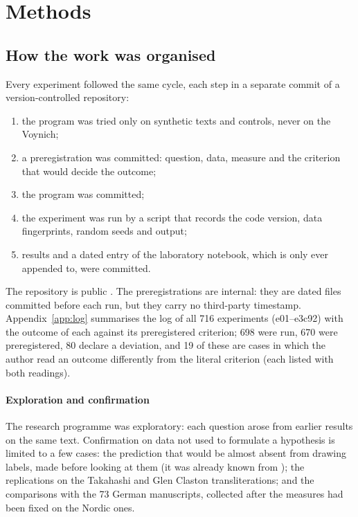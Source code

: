 \section{Methods}
\label{sec:methods}

\subsection{How the work was organised}

Every experiment followed the same cycle, each step in a separate commit of a version-controlled repository:
\begin{enumerate}
\item the program was tried only on synthetic texts and controls, never on the Voynich;
\item a preregistration was committed: question, data, measure and the criterion that would decide the outcome;
\item the program was committed;
\item the experiment was run by a script that records the code version, data fingerprints, random seeds and output;
\item results and a dated entry of the laboratory notebook, which is only ever appended to, were committed.
\end{enumerate}
The repository is public \citep{repository}. The preregistrations are internal: they are dated files committed before
each run, but they carry no third-party timestamp. Appendix~\ref{app:log} summarises the log of all 716 experiments
(e01--e3c92) with the outcome of each against its preregistered criterion; 698 were run, 670 were preregistered,
80 declare a deviation, and 19 of these are cases in which the author read an outcome differently from the literal criterion
(each listed with both readings).

\paragraph{Exploration and confirmation} The research programme was exploratory: each question arose from earlier
results on the same text. Confirmation on data not used to formulate a hypothesis is limited to a few cases: the
prediction that  would be almost absent from drawing labels, made before looking at them (it was already known
from \citealt{zandbergen_labels}); the replications on the Takahashi and Glen Claston transliterations; and the
comparisons with the 73 German manuscripts, collected after the measures had been fixed on the Nordic ones.


